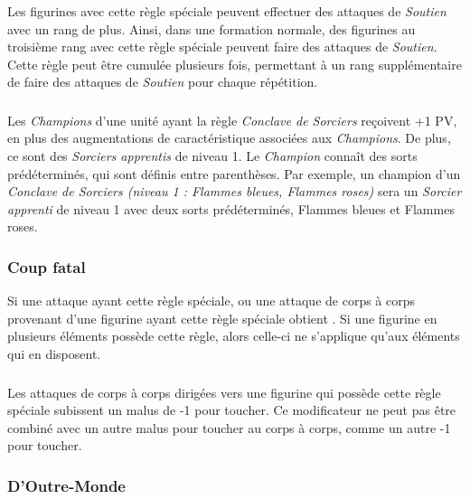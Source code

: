 Les figurines avec cette règle spéciale peuvent effectuer des attaques de \emph{Soutien} avec un rang de plus. Ainsi, dans une formation normale, des figurines au troisième rang avec cette règle spéciale peuvent faire des attaques de \emph{Soutien}. Cette règle peut être cumulée plusieurs fois, permettant à un rang supplémentaire de faire des attaques de \emph{Soutien} pour chaque répétition.

\subsubsection*{}

Les \emph{Champions} d'une unité ayant la règle \emph{Conclave de Sorciers} reçoivent +1 PV, en plus des augmentations de caractéristique associées aux \emph{Champions}. De plus, ce sont des \emph{Sorciers apprentis} de niveau 1. Le \emph{Champion} connaît des sorts prédéterminés, qui sont définis entre parenthèses. Par exemple, un champion d'un \emph{Conclave de Sorciers (niveau 1 : Flammes bleues, Flammes roses)} sera un \emph{Sorcier apprenti} de niveau 1 avec deux sorts prédéterminés, Flammes bleues et Flammes roses.

\subsubsection*{Coup fatal}

Si une attaque ayant cette règle spéciale, ou une attaque de corps à corps provenant d'une figurine ayant cette règle spéciale obtient . Si une figurine en plusieurs éléments possède cette règle, alors celle-ci ne s'applique qu'aux éléments qui en disposent.

\subsubsection*{}

Les attaques de corps à corps dirigées vers une figurine qui possède cette règle spéciale subissent un malus de -1 pour toucher. Ce modificateur ne peut pas être combiné avec un autre malus pour toucher au corps à corps, comme un autre -1 pour toucher.

\subsubsection*{D'Outre-Monde}

